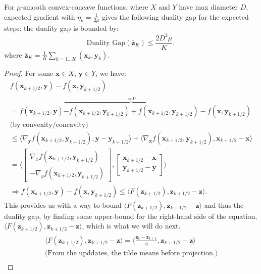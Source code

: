 \begin{proposition}
    \label{prop:proj_eg_smooth_convex_concave}
    For $\mu$-smooth convex-concave functions, where $X$ and $Y$ have max diameter $D$, expected gradient with $\eta_k = \frac{1}{2\mu}$ gives the following duality gap for the expected steps:
    the duality gap is bounded by:
    \[
        \text{Duality Gap}(\bar{\bm{z}}_K) \leq \frac{2 D^2 \mu}{K},
    \]
    where $\bar{\bm{z}}_K = \frac{1}{K} \sum_{k = 1...K} (\bm{x}_k,\bm{y}_k)$.
\end{proposition}


\begin{proof}
For some $\bm{x} \in X$, $\bm{y} \in Y$, we have:
\begin{align*}
    f(\bm{x}_{k+1/2},\bm{y}) - f(\bm{x},\bm{y}_{k+1/2}) \\
    = f(\bm{x}_{k+1/2},\bm{y}) \overbrace{- f(\bm{x}_{k+1/2},\bm{y}_{k+1/2}) + f(\bm{x}_{k+1/2},\bm{y}_{k+1/2})}^{=0}  - f(\bm{x},\bm{y}_{k+1/2}) \\
    \text{(by convexity/concavity)} \\
    \leq \langle \nabla_{\bm{y}} f(\bm{x}_{k+1/2},\bm{y}_{k+1/2}),\bm{y}- \bm{y}_{k+1/2} \rangle +
    \langle \nabla_{\bm{x}} f(\bm{x}_{k+1/2},\bm{y}_{k+1/2}), \bm{x}_{k+1/2} - \bm{x}\rangle  \\
    = 
    \Bigg \langle  
    \begin{bmatrix}
        \nabla_x f(\bm{x}_{k+1/2},\bm{y}_{k+1/2}) \\
        -\nabla_y f(\bm{x}_{k+1/2},\bm{y}_{k+1/2})
    \end{bmatrix} ,
    \begin{bmatrix}
        \bm{x}_{k+1/2} -\bm{x} \\ 
        \bm{y}_{k+1/2} - \bm{y}
    \end{bmatrix}
    \Bigg \rangle \\
    \Rightarrow f(\bm{x}_{k+1/2},\bm{y}) - f(\bm{x},\bm{y}_{k+1/2}) \leq 
    \langle F(\bm{z}_{k+1/2}), \bm{z}_{k+1/2} -\bm{z} \rangle.
\end{align*}
This provides us with a way to bound $\langle F(\bm{z}_{k+1/2}), \bm{z}_{k+1/2} -\bm{z} \rangle$ and thus the duality gap, by finding some upper-bound for the right-hand side of the equation, $\langle F(\bm{z}_{k+1/2}), \bm{z}_{k+1/2} -\bm{z} \rangle$, which is what we will do next.
\begin{align*}
    \langle F(\bm{z}_{k+1/2}), \bm{z}_{k+1/2} -\bm{z} \rangle
    = \Bigg \langle\frac{\bm{z}_k-\tilde{\bm{z}}_{k+1}}{\eta}, \bm{z}_{k+1/2} -\bm{z} \Bigg\rangle \\ \text{(From the upddates, the tilde means before projection.)} \\

\end{align*}
\end{proof}
